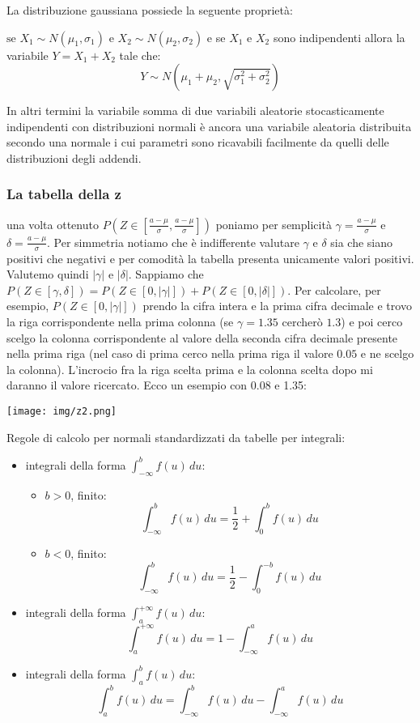 \documentclass[a4paper,12pt, oneside]{book}
\begin{document}
La distribuzione gaussiana possiede la seguente proprietà:
\begin{definizione}
     $\mbox{se } X_1 \sim N(\mu_1,\sigma_1) \mbox{ e } X_2 \sim N(\mu_2, \sigma_2)$ e se $X_1$ e $X_2$
        sono indipendenti allora la variabile $Y = X_1 + X_2$ tale che:
        \[Y \sim N(\mu_1 + \mu_2, \sqrt{\sigma_1^2 + \sigma_2^2})\]
\end{definizione}
In altri termini la variabile somma di due variabili aleatorie stocasticamente indipendenti con distribuzioni normali
è ancora una variabile aleatoria distribuita secondo una normale i cui parametri sono ricavabili facilmente
da quelli delle distribuzioni degli addendi.
\begin{shaded}
\subsubsection{La tabella della z}
una volta ottenuto $P\left(Z\in\left[\frac{a-\mu}{\sigma},\frac{a-\mu}{\sigma}\right]\right)$ poniamo per semplicità $\gamma= \frac{a-\mu}{\sigma}$ e $\delta=\frac{a-\mu}{\sigma}$. Per simmetria notiamo che è indifferente valutare $\gamma$ e $\delta$ sia che siano positivi che negativi e per comodità la tabella presenta unicamente valori positivi. Valutemo quindi $|\gamma|$ e $|\delta|$. Sappiamo che $P(Z\in[\gamma,\delta])=P(Z\in[0, |\gamma|])+P(Z\in[0,|\delta|])$. Per calcolare, per esempio, $P(Z\in[0, |\gamma|])$ prendo la cifra intera e la prima cifra decimale e trovo la riga corrispondente nella prima colonna (se $\gamma=1.35$ cercherò $1.3$) e poi cerco scelgo la colonna corrispondente al valore della seconda cifra decimale presente nella prima riga (nel caso di prima cerco nella prima riga il valore $0.05$ e ne scelgo la colonna). L'incrocio fra la riga scelta prima e la colonna scelta dopo mi daranno il valore ricercato. Ecco un esempio con 0.08 e 1.35:
\begin{center}
	\texttt{[image: img/z2.png]}
\end{center}
\end{shaded}
\begin{shaded}
Regole di calcolo per normali standardizzati da tabelle per integrali:
\begin{itemize}
	\item integrali della forma $\int_{-\infty}^bf(u)\,du$:
	\begin{itemize}
		\item $b>0$, finito:
			\[\int_{-\infty}^b f(u)\, du= \frac{1}{2}+\int_0^b f(u)\, du\]
		\item $b<0$, finito:
			\[\int_{-\infty}^b f(u)\, du= \frac{1}{2}-\int_0^{-b} f(u)\, du\]
	\end{itemize}
	\item integrali della forma $\int_{a}^{+\infty}f(u)\,du$:
		\[\int_{a}^{+\infty}f(u)\,du= 1-\int_{-\infty}^{a} f(u)\, du\]
	\item integrali della forma $\int_{a}^{b}f(u)\,du$:
		\[\int_{a}^{b}f(u)\,du=\int_{-\infty}^bf(u)\,du-\int_{-\infty}^a f(u)\,du\]
\end{itemize}
\end{shaded}
\end{document}
